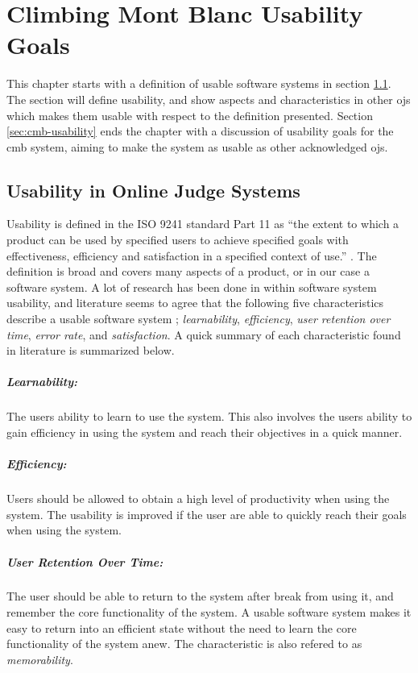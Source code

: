 \chapter{Climbing Mont Blanc Usability Goals}
This chapter starts with a definition of usable software systems in section \ref{sec:usability-def}. The section will define usability, and show aspects and characteristics in other \gls{ojs} which makes them usable with respect to the definition presented. Section \ref{sec:cmb-usability} ends the chapter with a discussion of usability goals for the \gls{cmb} system, aiming to make the system as usable as other acknowledged \gls{ojs}.

\section{Usability in Online Judge Systems}
\label{sec:usability-def}
Usability is defined in the ISO 9241 standard Part 11 as ``the extent to which a product can be used by specified users to achieve specified goals with effectiveness, efficiency and satisfaction in a specified context of use.'' \cite{ISO1998}. The definition is broad and covers many aspects of a product, or in our case a software system. A lot of research has been done in within software system usability, and literature seems to agree that the following five characteristics describe a usable software system \cite{holzinger2005, ferre2001}; \textit{learnability}, \textit{efficiency}, \textit{user retention over time}, \textit{error rate}, and \textit{satisfaction}. A quick summary of each characteristic found in literature is summarized below.

\paragraph*{Learnability:} The users ability to learn to use the system. This also involves the users ability to gain efficiency in using the system and reach their objectives in a quick manner.

\paragraph*{Efficiency:} Users should be allowed to obtain a high level of productivity when using the system. The usability is improved if the user are able to quickly reach their goals when using the system.

\paragraph*{User Retention Over Time:} The user should be able to return to the system after break from using it, and remember the core functionality of the system. A usable software system makes it easy to return into an efficient state without the need to learn the core functionality of the system anew. The characteristic is also refered to as \textit{memorability}.

